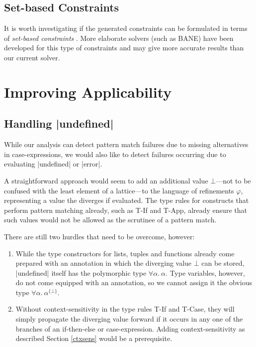 \subsection{Set-based Constraints}

It is worth investigating if the generated constraints can be formulated in terms of \emph{set-based constraints} \cite{aiken,Heintze94setconstraints}. More elaborate solvers (such as BANE) have been developed for this type of constraints and may give more accurate results than our current solver.

\section{Improving Applicability}

\subsection{Handling |undefined|}

While our analysis can detect pattern match failures due to missing alternatives in case-expressions, we would also like to detect failures occurring due to evaluating |undefined| or |error|.

A straightforward approach would seem to add an additional value $\bot$---not to be confused with the least element of a lattice---to the language of refinements $\varphi$, representing a value the diverges if evaluated. The type rules for constructs that perform pattern matching already, such as T-If and T-App, already ensure that such values would not be allowed as the scrutinee of a pattern match.

There are still two hurdles that need to be overcome, however:
\begin{enumerate}
\item While the type constructors for lists, tuples and functions already come prepared with an annotation in which the diverging value $\bot$ can be stored, |undefined| itself has the polymorphic type $\forall \alpha.\ \alpha$. Type variables, however, do not come equipped with an annotation, so we cannot assign it the obvious type $\forall \alpha.\ \alpha^{\{\bot\}}$.
\item Without context-sensitivity in the type rules T-If and T-Case, they will simply propagate the diverging value forward if it occurs in any one of the branches of an if-then-else or case-expression. Adding context-sensitivity as described Section \ref{ctxsens} would be a prerequisite.
\end{enumerate}

%
%
%

